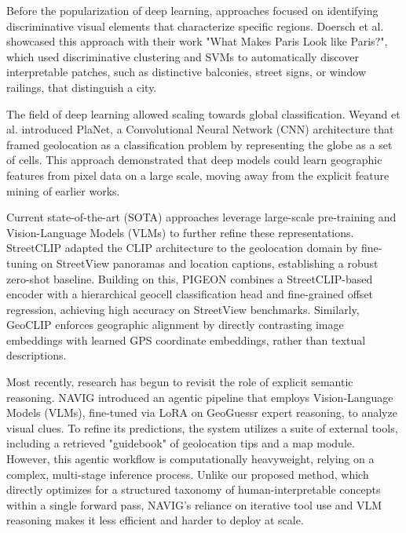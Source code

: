 \documentclass{article}
\begin{document}
Before the popularization of deep learning, approaches focused on identifying discriminative visual elements that characterize specific regions. Doersch et al. \cite{10.1145/2830541} showcased this approach with their work "What Makes Paris Look like Paris?", which used discriminative clustering and SVMs to automatically discover interpretable patches, such as distinctive balconies, street signs, or window railings, that distinguish a city.

The field of deep learning allowed scaling towards global classification. Weyand et al. \cite{Weyand_2016} introduced PlaNet, a Convolutional Neural Network (CNN) architecture that framed geolocation as a classification problem by representing the globe as a set of cells. This approach demonstrated that deep models could learn geographic features from pixel data on a large scale, moving away from the explicit feature mining of earlier works.

Current state-of-the-art (SOTA) approaches leverage large-scale pre-training and Vision-Language Models (VLMs) to further refine these representations. StreetCLIP \cite{haas2023learning} adapted the CLIP architecture to the geolocation domain by fine-tuning on StreetView panoramas and location captions, establishing a robust zero-shot baseline. Building on this, PIGEON \cite{haas2024pigeonpredictingimagegeolocations} combines a StreetCLIP-based encoder with a hierarchical geocell classification head and fine-grained offset regression, achieving high accuracy on StreetView benchmarks. Similarly, GeoCLIP \cite{cepeda2023geoclipclipinspiredalignmentlocations} enforces geographic alignment by directly contrasting image embeddings with learned GPS coordinate embeddings, rather than textual descriptions.

Most recently, research has begun to revisit the role of explicit semantic reasoning. NAVIG \cite{zhang2025navignaturallanguageguidedanalysis} introduced an agentic pipeline that employs Vision-Language Models (VLMs), fine-tuned via LoRA on GeoGuessr expert reasoning, to analyze visual clues. To refine its predictions, the system utilizes a suite of external tools, including a retrieved "guidebook" of geolocation tips and a map module. However, this agentic workflow is computationally heavyweight, relying on a complex, multi-stage inference process. Unlike our proposed method, which directly optimizes for a structured taxonomy of human-interpretable concepts within a single forward pass, NAVIG’s reliance on iterative tool use and VLM reasoning makes it less efficient and harder to deploy at scale.
\end{document}
